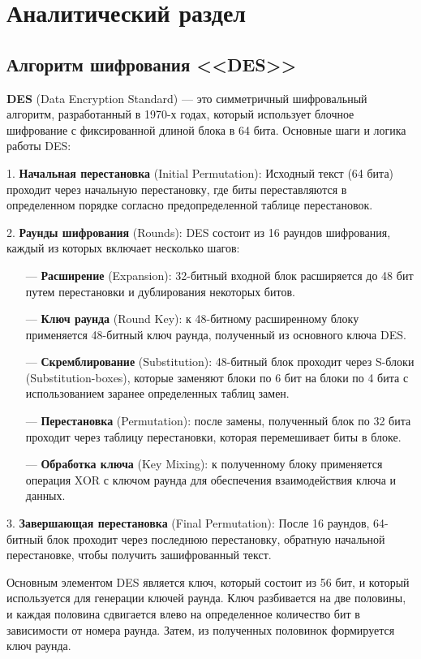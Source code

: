 \chapter{Аналитический раздел}

\section{Алгоритм шифрования <<DES>>}

\textbf{DES} (Data Encryption Standard) \cite{Enigma} --- это симметричный шифровальный алгоритм, разработанный в 1970-х годах, который использует блочное шифрование с фиксированной длиной блока в 64 бита. Основные шаги и логика работы DES:

1. \textbf{Начальная перестановка} (Initial Permutation):
Исходный текст (64 бита) проходит через начальную перестановку, где биты переставляются в определенном порядке согласно предопределенной таблице перестановок.

2. \textbf{Раунды шифрования} (Rounds):
DES состоит из 16 раундов шифрования, каждый из которых включает несколько шагов:
\begin{itemize}
	\item[---] \textbf{Расширение} (Expansion): 32-битный входной блок расширяется до 48 бит путем перестановки и дублирования некоторых битов.
	\item[---] \textbf{Ключ раунда} (Round Key): к 48-битному расширенному блоку применяется 48-битный ключ раунда, полученный из основного ключа DES.
	\item[---] \textbf{Скремблирование} (Substitution): 48-битный блок проходит через S-блоки (Substitution-boxes), которые заменяют блоки по 6 бит на блоки по 4 бита с использованием заранее определенных таблиц замен.
	\item[---] \textbf{Перестановка} (Permutation):  после замены, полученный блок по 32 бита проходит через таблицу перестановки, которая перемешивает биты в блоке.
	\item[---] \textbf{Обработка ключа} (Key Mixing): к полученному блоку применяется операция XOR с ключом раунда для обеспечения взаимодействия ключа и данных.
\end{itemize}

3. \textbf{Завершающая перестановка} (Final Permutation):
После 16 раундов, 64-битный блок проходит через последнюю перестановку, обратную начальной перестановке, чтобы получить зашифрованный текст.

Основным элементом DES является ключ, который состоит из 56 бит, и который используется для генерации ключей раунда. Ключ разбивается на две половины, и каждая половина сдвигается влево на определенное количество бит в зависимости от номера раунда. Затем, из полученных половинок формируется ключ раунда.


